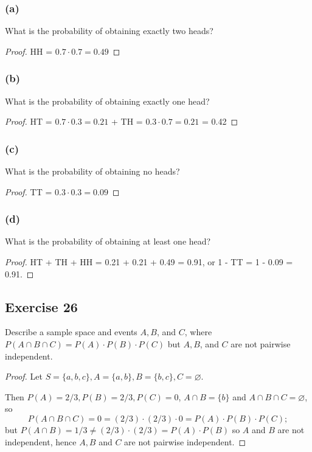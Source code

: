 \documentclass[14pt]{extarticle}
\newcommand{\es}{\varnothing}
\begin{document}
\subsubsection{(a)}
What is the probability of obtaining exactly two heads?
\begin{proof}
     HH = \(0.7 \cdot 0.7 = 0.49\)
\end{proof}

\subsubsection{(b)}
What is the probability of obtaining exactly one head?
\begin{proof}
     HT = \(0.7 \cdot 0.3 = 0.21\) + TH = \(0.3 \cdot 0.7 = 0.21\) = 0.42
\end{proof}

\subsubsection{(c)}
What is the probability of obtaining no heads?
\begin{proof}
     TT = \(0.3 \cdot 0.3 = 0.09\)
\end{proof}

\subsubsection{(d)}
What is the probability of obtaining at least one head?

\begin{proof}
     HT + TH + HH = 0.21 + 0.21 + 0.49 = 0.91, or 1 - TT = 1 - 0.09 = 0.91.
\end{proof}

\subsection{Exercise 26}
Describe a sample space and events \(A, B\), and \(C\), where \(P(A \cap B \cap C) = P(A) \cdot P(B) \cdot P(C)\) but
\(A, B\), and \(C\) are not pairwise independent.

\begin{proof}
     Let \(S = \{a, b, c\}, A = \{a,b\}, B = \{b,c\}, C = \es\).

     Then \(P(A) = 2/3, P(B) = 2/3, P(C) = 0\), \(A \cap B = \{b\}\) and \(A \cap B \cap C = \es\), so
     \[
          P(A \cap B \cap C) = 0 = (2/3) \cdot (2/3) \cdot 0 = P(A) \cdot P(B) \cdot P(C);
     \]
     but \(P(A \cap B) = 1/3 \neq (2/3) \cdot (2/3) = P(A) \cdot P(B)\) so \(A\) and \(B\) are not independent, hence \(A,B\)
     and \(C\) are not pairwise independent.
\end{proof}
\end{document}
